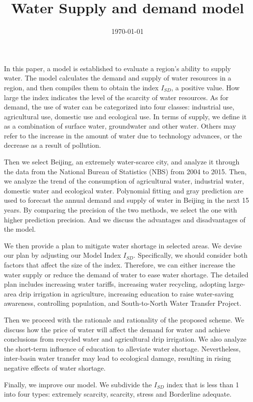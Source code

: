 \documentclass{mcmthesis}
\title{Water Supply and demand model}
\date{\today}
\begin{document}
\begin{sheetsummary}

\par In this paper, a model is established to evaluate a region’s ability to supply water. The model calculates the demand and supply of water resources in a region, and then compiles them to obtain the index $I_{SD}$, a positive value. How large the index indicates the level of the scarcity of water resources. As for demand, the use of water can be categorized into four classes: industrial use, agricultural use, domestic use and ecological use. In terms of supply, we define it as a combination of surface water, groundwater and other water. Others may refer to the increase in the amount of water due to technology advances, or the decrease as a result of pollution.
\par Then we select Beijing, an extremely water-scarce city, and analyze it through the data from the National Bureau of Statistics (NBS) from 2004 to 2015. Then, we analyze the trend of the consumption of agricultural water, industrial water, domestic water and ecological water. Polynomial fitting and gray prediction are used to forecast the annual demand and supply of water in Beijing in the next 15 years. By comparing the precision of the two methods, we select the one with higher prediction precision. And we discuss the advantages and disadvantages of the model.
\par We then provide a plan to mitigate water shortage in selected areas. We devise our plan by adjusting our Model Index $I_{SD}$. Specifically, we should consider both factors that affect the size of the index. Therefore, we can either increase the water supply or reduce the demand of water to ease water shortage. The detailed plan includes increasing water tariffs, increasing water recycling, adopting large-area drip irrigation in agriculture, increasing education to raise water-saving awareness, controlling population, and South-to-North Water Transfer Project.
\par Then we proceed with the rationale and rationality of the proposed scheme. We discuss how the price of water will affect the demand for water and achieve conclusions from recycled water and agricultural drip irrigation. We also analyze the short-term influence of education to alleviate water shortage. Nevertheless, inter-basin water transfer may lead to ecological damage, resulting in rising negative effects of water shortage.
\par Finally, we improve our model. We subdivide the $I_{SD}$ index that is less than 1 into four types: extremely scarcity, scarcity, stress and Borderline adequate.



\end{sheetsummary}
\end{document}
